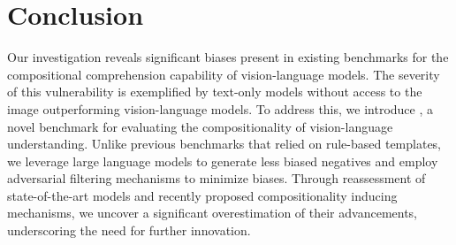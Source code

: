 \section{Conclusion}

Our investigation reveals significant biases present in existing benchmarks for the compositional comprehension capability of vision-language models. The severity of this vulnerability is exemplified by text-only models without access to the image outperforming vision-language models. To address this, we introduce \method, a novel benchmark for evaluating the compositionality of vision-language understanding. Unlike previous benchmarks that relied on rule-based templates, we leverage large language models to generate less biased negatives and employ adversarial filtering mechanisms to minimize biases. Through reassessment of state-of-the-art models and recently proposed compositionality inducing mechanisms, we uncover a significant overestimation of their advancements, underscoring the need for further innovation.